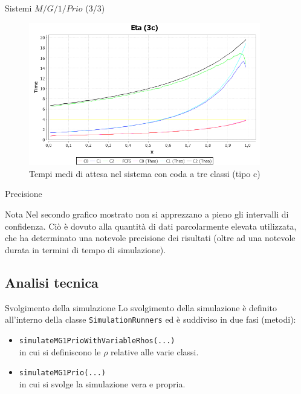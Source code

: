 \documentclass[slidestop,compress,mathserif]{beamer}
\begin{document}
\begin{frame}{Sistemi $M/G/1/Prio$ (3/3)}
\begin{figure}[!h]{
	\begin{center}
	   \includegraphics[width=0.9\textwidth]{figures/MG1PRIO3c[mu=2,runs=10000,arrivals=1000].png}
	\end{center}}
	\caption{Tempi medi di attesa nel sistema con coda a tre classi (tipo c)}
	\label{fig:mg1prio3c}
\end{figure}
\end{frame}

\begin{frame}{Precisione}
\vfill
\begin{block}{Nota}
Nel secondo grafico mostrato non si apprezzano a pieno gli intervalli di confidenza. Ci\`o \`e dovuto alla quantit\`a di dati parcolarmente elevata utilizzata, che  ha determinato una notevole precisione dei risultati (oltre ad una notevole durata in termini di tempo di simulazione).
\end{block}
\vfill
\end{frame}

\subsection{Analisi tecnica}
\begin{frame}{Svolgimento della simulazione}
\vfill
Lo svolgimento della simulazione \`e definito all'interno della classe {\tt SimulationRunners} ed \`e suddiviso in due fasi (metodi):
\begin{itemize}
\item {\tt simulateMG1PrioWithVariableRhos(...)}\\
in cui si definiscono le $\rho$ relative alle varie classi.
\item {\tt simulateMG1Prio(...)}\\
in cui si svolge la simulazione vera e propria.
\end{itemize}
\vfill
\end{frame}
\end{document}
